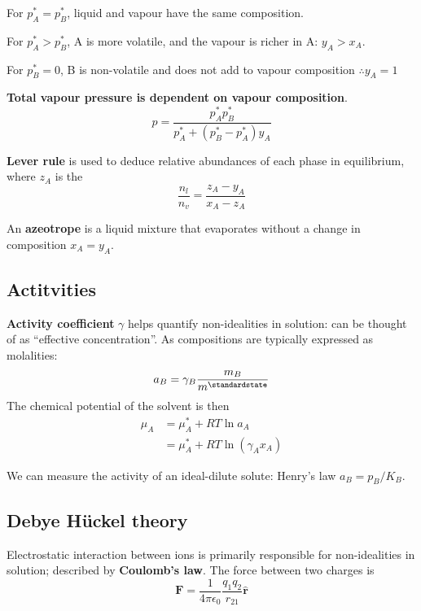 For $p_A^* = p_B^*$, liquid and vapour have the same composition.

For $p_A^* > p_B^*$, A is more volatile, and the vapour is richer in A: $y_A > x_A$.

For $p_B^* = 0$, B is non-volatile and does not add to vapour composition $\therefore y_A = 1$

\textbf{Total vapour pressure is dependent on vapour composition}.
\begin{equation*}
    p = \frac{p_A^* p_B^*}{p^*_A + (p_B^* - p_A^*)y_A}
\end{equation*}

\textbf{Lever rule} is used to deduce relative abundances
 of each phase in equilibrium, where $z_A$ is the
 \begin{equation*}
    \frac{n_l}{n_v} = \frac{z_A - y_A}{x_A - z_A}
 \end{equation*}

 An \textbf{azeotrope} is a liquid mixture that evaporates without a change in composition $x_A = y_A$.
\subsection*{Actitvities}
\textbf{Activity coefficient} $\gamma$ helps quantify non-idealities in solution: can be thought of as “effective concentration”.
As compositions are typically expressed as molalities:
\begin{equation*}
    a_B = \gamma_B \frac{m_B}{m^\standardstate}
\end{equation*}
The chemical potential of the solvent is then
\begin{equation*}
    \begin{aligned}
        \mu_A &= \mu_A^* + RT \ln a_A \\
        &= \mu_A^* + RT \ln (\gamma_A x_A)
    \end{aligned}
\end{equation*}

We can measure the activity of an ideal-dilute solute: Henry's law $a_B = p_B / K_B$.
\subsection*{Debye H\"uckel theory}
Electrostatic interaction between ions is primarily responsible for non-idealities
in solution; described by \textbf{Coulomb's law}.
The force between two charges is
\begin{equation*}
  \mathbf{F} = \frac{1}{4\pi\epsilon_0}\frac{q_1q_2}{r_{21}}\hat{\mathbf{r}}
\end{equation*}

